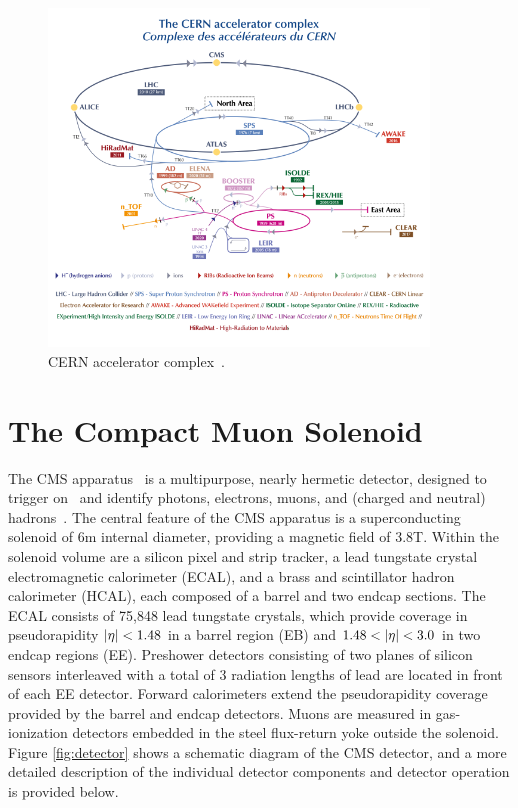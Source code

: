 \begin{figure}[tb]
  \centering
   \includegraphics[width=0.9\textwidth]{fig/experiment/CCC-v2019-final-white.png}
	\caption[CERN accelerator complex.]{CERN accelerator complex~\cite{CERN_complex}.}
	\label{fig:accelerator_complex}
\end{figure}


\section{The Compact Muon Solenoid}
The CMS apparatus~\cite{CMS:2008xjf} is a multipurpose, nearly hermetic detector, designed to trigger on~\cite{CMS:2020cmk,CMS:2016ngn} and identify photons, electrons, muons, and (charged and neutral) hadrons~\cite{CMS:2015myp,CMS:2015xaf,CMS:2018rym,CMS:2014pgm}.
The central feature of the CMS apparatus is a superconducting solenoid of 6\unit{m} internal diameter, providing a magnetic field of $3.8$\unit{T}. Within the solenoid volume are a silicon pixel and strip tracker, a lead tungstate crystal electromagnetic calorimeter (ECAL), and a brass and scintillator hadron calorimeter (HCAL), each composed of a barrel and two endcap sections. The ECAL consists of 75,848 lead tungstate crystals, which provide coverage in pseudorapidity $\lvert \eta \rvert < 1.48 $ in a barrel region (EB) and $1.48 < \lvert \eta \rvert < 3.0$ in two endcap regions (EE). Preshower detectors consisting of two planes of silicon sensors interleaved with a total of $3$ radiation lengths of lead are located in front of each EE detector. Forward calorimeters extend the pseudorapidity coverage provided by the barrel and endcap detectors. Muons are measured in gas-ionization detectors embedded in the steel flux-return yoke outside the solenoid. Figure \ref{fig:detector} shows a schematic diagram of the CMS detector, and a more detailed description of the individual detector components and detector operation is provided below. 


